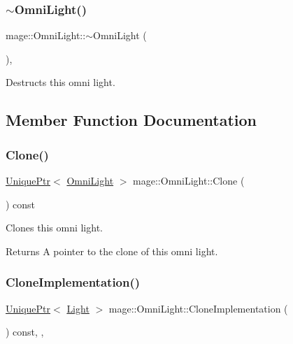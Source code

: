 \subsubsection{\texorpdfstring{$\sim$\+Omni\+Light()}{~OmniLight()}}
{\footnotesize\ttfamily mage\+::\+Omni\+Light\+::$\sim$\+Omni\+Light (\begin{DoxyParamCaption}{ }\end{DoxyParamCaption})\hspace{0.3cm}{\ttfamily [virtual]}, {\ttfamily [default]}}

Destructs this omni light. 

\subsection{Member Function Documentation}
\hypertarget{classmage_1_1_omni_light_a82325924de65733314dcf2b87e926d60}{}\label{classmage_1_1_omni_light_a82325924de65733314dcf2b87e926d60} 
\subsubsection{\texorpdfstring{Clone()}{Clone()}}
{\footnotesize\ttfamily \hyperlink{namespacemage_a3316d7143a973e37adf1110f2e80ca31}{Unique\+Ptr}$<$ \hyperlink{classmage_1_1_omni_light}{Omni\+Light} $>$ mage\+::\+Omni\+Light\+::\+Clone (\begin{DoxyParamCaption}{ }\end{DoxyParamCaption}) const}

Clones this omni light.

\begin{DoxyReturn}{Returns}
A pointer to the clone of this omni light. 
\end{DoxyReturn}
\hypertarget{classmage_1_1_omni_light_a1212457828cdd96cc7170767b7bd1223}{}\label{classmage_1_1_omni_light_a1212457828cdd96cc7170767b7bd1223} 
\subsubsection{\texorpdfstring{Clone\+Implementation()}{CloneImplementation()}}
{\footnotesize\ttfamily \hyperlink{namespacemage_a3316d7143a973e37adf1110f2e80ca31}{Unique\+Ptr}$<$ \hyperlink{classmage_1_1_light}{Light} $>$ mage\+::\+Omni\+Light\+::\+Clone\+Implementation (\begin{DoxyParamCaption}{ }\end{DoxyParamCaption}) const\hspace{0.3cm}{\ttfamily [override]}, {\ttfamily [private]}, {\ttfamily [virtual]}}


